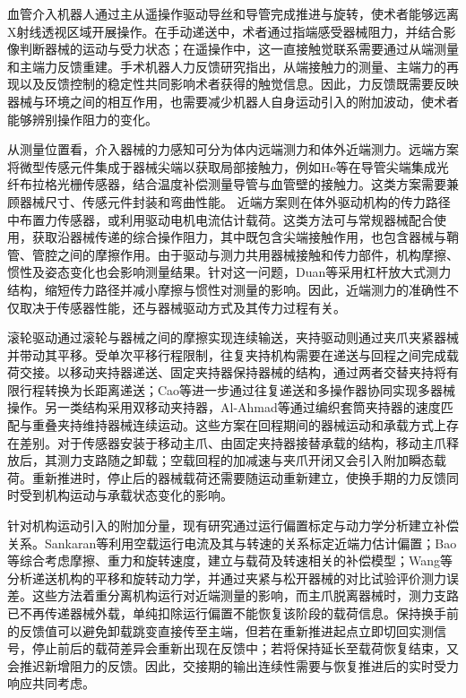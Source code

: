 \documentclass{JQRnew}
\begin{document}
\maketitle

血管介入机器人通过主从遥操作驱动导丝和导管完成推进与旋转，使术者能够远离X射线透视区域开展操作。在手动递送中，术者通过指端感受器械阻力，并结合影像判断器械的运动与受力状态；在遥操作中，这一直接触觉联系需要通过从端测量和主端力反馈重建。手术机器人力反馈研究指出，从端接触力的测量、主端力的再现以及反馈控制的稳定性共同影响术者获得的触觉信息。因此，力反馈既需要反映器械与环境之间的相互作用，也需要减少机器人自身运动引入的附加波动，使术者能够辨别操作阻力的变化。

从测量位置看，介入器械的力感知可分为体内远端测力和体外近端测力。远端方案将微型传感元件集成于器械尖端以获取局部接触力，例如He等在导管尖端集成光纤布拉格光栅传感器，结合温度补偿测量导管与血管壁的接触力。这类方案需要兼顾器械尺寸、传感元件封装和弯曲性能。
\JQRpubidadjcol
近端方案则在体外驱动机构的传力路径中布置力传感器，或利用驱动电机电流估计载荷。这类方法可与常规器械配合使用，获取沿器械传递的综合操作阻力，其中既包含尖端接触作用，也包含器械与鞘管、管腔之间的摩擦作用。由于驱动与测力共用器械接触和传力部件，机构摩擦、惯性及姿态变化也会影响测量结果。针对这一问题，Duan等采用杠杆放大式测力结构，缩短传力路径并减小摩擦与惯性对测量的影响。因此，近端测力的准确性不仅取决于传感器性能，还与器械驱动方式及其传力过程有关。

滚轮驱动通过滚轮与器械之间的摩擦实现连续输送，夹持驱动则通过夹爪夹紧器械并带动其平移。受单次平移行程限制，往复夹持机构需要在递送与回程之间完成载荷交接。以移动夹持器递送、固定夹持器保持器械的结构，通过两者交替夹持将有限行程转换为长距离递送；Cao等进一步通过往复递送和多操作器协同实现多器械操作。另一类结构采用双移动夹持器，Al-Ahmad等通过编织套筒夹持器的速度匹配与重叠夹持维持器械连续运动。这些方案在回程期间的器械运动和承载方式上存在差别。对于传感器安装于移动主爪、由固定夹持器接替承载的结构，移动主爪释放后，其测力支路随之卸载；空载回程的加减速与夹爪开闭又会引入附加瞬态载荷。重新推进时，停止后的器械载荷还需要随运动重新建立，使换手期的力反馈同时受到机构运动与承载状态变化的影响。

针对机构运动引入的附加分量，现有研究通过运行偏置标定与动力学分析建立补偿关系。Sankaran等利用空载运行电流及其与转速的关系标定近端力估计偏置；Bao等综合考虑摩擦、重力和旋转速度，建立与载荷及转速相关的补偿模型；Wang等分析递送机构的平移和旋转动力学，并通过夹紧与松开器械的对比试验评价测力误差。这些方法着重分离机构运行对近端测量的影响，而主爪脱离器械时，测力支路已不再传递器械外载，单纯扣除运行偏置不能恢复该阶段的载荷信息。保持换手前的反馈值可以避免卸载跳变直接传至主端，但若在重新推进起点立即切回实测信号，停止前后的载荷差异会重新出现在反馈中；若将保持延长至载荷恢复结束，又会推迟新增阻力的反馈。因此，交接期的输出连续性需要与恢复推进后的实时受力响应共同考虑。
\end{document}
